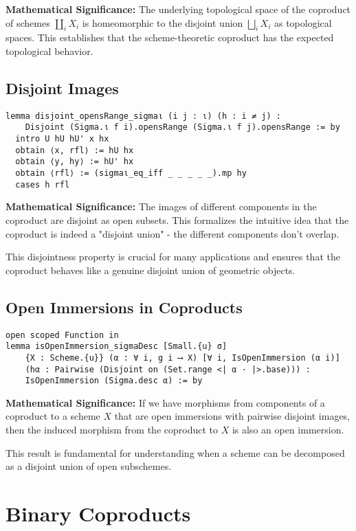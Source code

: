 \documentclass{article}
\theoremstyle{definition}
\begin{document}
\textbf{Mathematical Significance:} The underlying topological space of the coproduct of schemes $\coprod_i X_i$ is homeomorphic to the disjoint union $\bigsqcup_i X_i$ as topological spaces. This establishes that the scheme-theoretic coproduct has the expected topological behavior.

\subsection{Disjoint Images}

\begin{lstlisting}
lemma disjoint_opensRange_sigmaι (i j : ι) (h : i ≠ j) :
    Disjoint (Sigma.ι f i).opensRange (Sigma.ι f j).opensRange := by
  intro U hU hU' x hx
  obtain ⟨x, rfl⟩ := hU hx
  obtain ⟨y, hy⟩ := hU' hx
  obtain ⟨rfl⟩ := (sigmaι_eq_iff _ _ _ _ _).mp hy
  cases h rfl
\end{lstlisting}

\textbf{Mathematical Significance:} The images of different components in the coproduct are disjoint as open subsets. This formalizes the intuitive idea that the coproduct is indeed a "disjoint union" - the different components don't overlap.

This disjointness property is crucial for many applications and ensures that the coproduct behaves like a genuine disjoint union of geometric objects.

\subsection{Open Immersions in Coproducts}

\begin{lstlisting}
open scoped Function in
lemma isOpenImmersion_sigmaDesc [Small.{u} σ]
    {X : Scheme.{u}} (α : ∀ i, g i ⟶ X) [∀ i, IsOpenImmersion (α i)]
    (hα : Pairwise (Disjoint on (Set.range <| α · |>.base))) :
    IsOpenImmersion (Sigma.desc α) := by
\end{lstlisting}

\textbf{Mathematical Significance:} If we have morphisms from components of a coproduct to a scheme $X$ that are open immersions with pairwise disjoint images, then the induced morphism from the coproduct to $X$ is also an open immersion.

This result is fundamental for understanding when a scheme can be decomposed as a disjoint union of open subschemes.

\section{Binary Coproducts}
\end{document}
